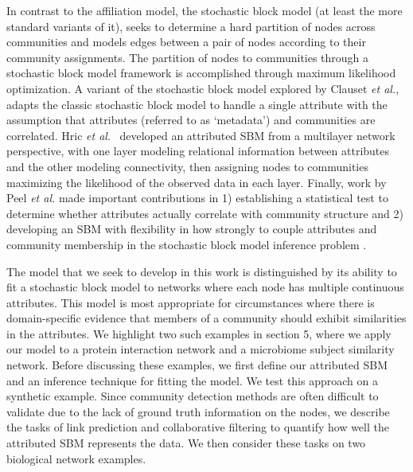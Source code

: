 \documentclass[journal]{IEEEtran}
\begin{document}
In contrast to the affiliation model, the stochastic block model \cite{sbmOrig} (at least the more standard variants of it), seeks to determine a hard partition of nodes across communities and models edges between a pair of nodes according to their community assignments. The partition of nodes to communities through a stochastic block model framework is accomplished through maximum likelihood optimization. A variant of the stochastic block model explored by Clauset \emph{et al.}, \cite{clauset} adapts the classic stochastic block model to handle a single attribute with the assumption that attributes (referred to as `metadata') and communities are correlated. Hric \emph{et al}.~\cite{hric} developed an attributed SBM from a multilayer network perspective, with one layer modeling relational information between attributes and the other modeling connectivity, then assigning nodes to communities maximizing the likelihood of the observed data in each layer. Finally, work by Peel \emph{et al.} made important contributions in 1) establishing a statistical test to determine whether attributes actually correlate with community structure and 2) developing an SBM with flexibility in how strongly to couple attributes and community membership in the stochastic block model inference problem \cite{peel2017ground}. 

The model that we seek to develop in this work is distinguished by its ability to fit a stochastic block model to networks where each node has multiple continuous attributes. This model is most appropriate for circumstances where there is domain-specific evidence that members of a community should exhibit similarities in the attributes. We highlight two such examples in section 5, where we apply our model to a protein interaction network and a microbiome subject similarity network. Before discussing these examples, we first define our attributed SBM and an inference technique for fitting the model. We test this approach on a synthetic example. Since community detection methods are often difficult to validate due to the lack of ground truth information on the nodes, we describe the tasks of link prediction and collaborative filtering to quantify how well the attributed SBM represents the data. We then consider these tasks on two biological network examples.
\end{document}
